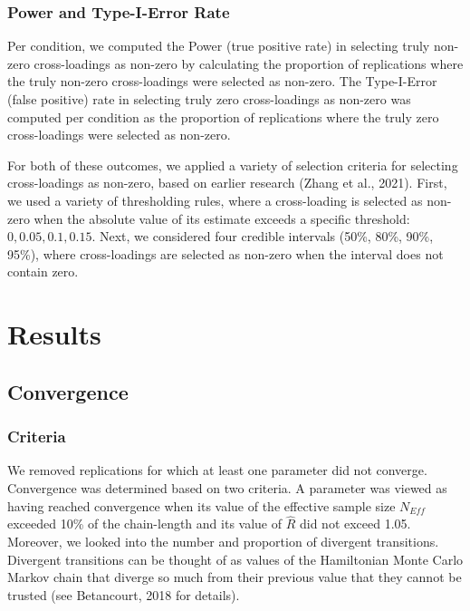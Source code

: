 \documentclass[
  man, donotrepeattitle,floatsintext]{apa6}
\begin{document}
\hypertarget{power-and-type-i-error-rate}{%
\subsubsection{Power and Type-I-Error Rate}\label{power-and-type-i-error-rate}}

Per condition, we computed the Power (true positive rate) in selecting truly non-zero cross-loadings as non-zero by calculating the proportion of replications where the truly non-zero cross-loadings were selected as non-zero. The Type-I-Error (false positive) rate in selecting truly zero cross-loadings as non-zero was computed per condition as the proportion of replications where the truly zero cross-loadings were selected as non-zero.

For both of these outcomes, we applied a variety of selection criteria for selecting cross-loadings as non-zero, based on earlier research (Zhang et al., 2021). First, we used a variety of thresholding rules, where a cross-loading is selected as non-zero when the absolute value of its estimate exceeds a specific threshold: \(0, 0.05, 0.1, 0.15\). Next, we considered four credible intervals (50\%, 80\%, 90\%, 95\%), where cross-loadings are selected as non-zero when the interval does not contain zero.

\hypertarget{results}{%
\section{Results}\label{results}}

\hypertarget{convergence}{%
\subsection{Convergence}\label{convergence}}

\hypertarget{criteria}{%
\subsubsection{Criteria}\label{criteria}}

We removed replications for which at least one parameter did not converge. Convergence was determined based on two criteria. A parameter was viewed as having reached convergence when its value of the effective sample size \(N_{Eff}\) exceeded 10\% of the chain-length and its value of \(\hat{R}\) did not exceed 1.05.
Moreover, we looked into the number and proportion of divergent transitions. Divergent transitions can be thought of as values of the Hamiltonian Monte Carlo Markov chain that diverge so much from their previous value that they cannot be trusted (see Betancourt, 2018 for details).
\end{document}

